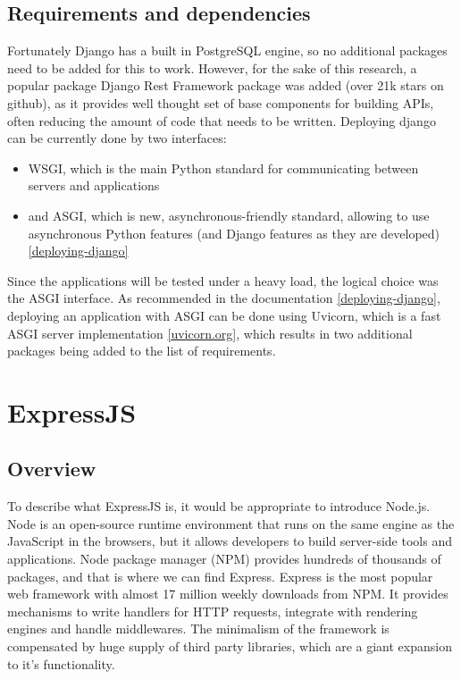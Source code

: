 \subsection{Requirements and dependencies}
Fortunately Django has a built in PostgreSQL engine, so no additional packages need to be added for this to work. However, for the sake of this research, a popular package Django Rest Framework package was added (over 21k stars on github), as it provides well thought set of base components for building APIs, often reducing the amount of code that needs to be written.
Deploying django can be currently done by two interfaces:
\begin{itemize}
    \item WSGI, which is the main Python standard for communicating between servers and applications
    \item and ASGI, which is new, asynchronous-friendly standard, allowing to use asynchronous Python features (and Django features as they are developed) \ref{deploying-django}
\end{itemize}

Since the applications will be tested under a heavy load, the logical choice was the ASGI interface. As recommended in the documentation \ref{deploying-django}, deploying an application with ASGI can be done using Uvicorn, which is a fast ASGI server implementation \ref{uvicorn.org}, which results in two additional packages being added to the list of requirements.

\section{ExpressJS}

\subsection{Overview}

To describe what ExpressJS is, it would be appropriate to introduce Node.js. Node is an open-source runtime environment that runs on the same engine as the JavaScript in the browsers, but it allows developers to build server-side tools and applications. Node package manager (NPM) provides hundreds of thousands of packages, and that is where we can find Express. %
Express is the most popular web framework with almost 17 million weekly downloads from NPM. It provides mechanisms to write handlers for HTTP requests, integrate with rendering engines and handle middlewares. The minimalism of the framework is compensated by huge supply of third party libraries, which are a giant expansion to it's functionality.

